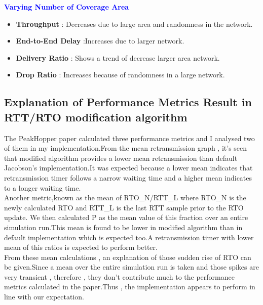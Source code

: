 \documentclass{article}[12pt]
\begin{document}
\textbf{\textcolor{blue}{Varying Number of Coverage Area}}
\begin{itemize}
	\item \textbf{Throughput} : Decreases due to large area and randomness in the network.
	\item \textbf{End-to-End Delay} :Increases due to larger network.
	\item \textbf{Delivery Ratio} : Shows a trend of decrease larger area network.
	\item \textbf{Drop Ratio} : Increases because of randomness in a large network.
\end{itemize}
    
\newpage

\subsection{Explanation of Performance Metrics Result in RTT/RTO modification algorithm}

The PeakHopper paper calculated three performance metrics and I analysed two of them in my implementation.From the mean retransmission graph , it's seen that modified algorithm provides a lower mean retransmission than default Jacobson's implementation.It was expected because a lower mean indicates that retransmission timer follows a narrow waiting time and a higher mean indicates to a longer waiting time.\\

Another metric,known as the mean of RTO\_N/RTT\_L where  RTO\_N is the newly calculated RTO
and RTT\_L is the last RTT sample prior to the RTO
update. We then calculated P as the mean value of this
fraction over an entire simulation run.This mean is found to be lower in modified algorithm than in default implementation which is expected too.A retransmission timer with lower mean of this ratios is expected to perform better.\\

From these mean calculations , an explanation of those sudden rise of RTO can be given.Since a mean over the entire simulation run is taken and those spikes are very transient , therefore , they don't contribute much to the performance metrics calculated in the paper.Thus , the implementation appears to perform in line with our expectation.  
\end{document}
